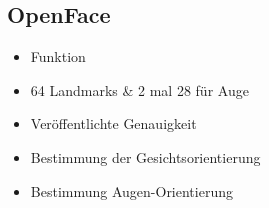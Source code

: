 \subsection{OpenFace}
\begin{itemize}
\item Funktion
\item 64 Landmarks \& 2 mal 28 für Auge
\item Veröffentlichte Genauigkeit
\item Bestimmung der Gesichtsorientierung
\item Bestimmung Augen-Orientierung
\end{itemize}